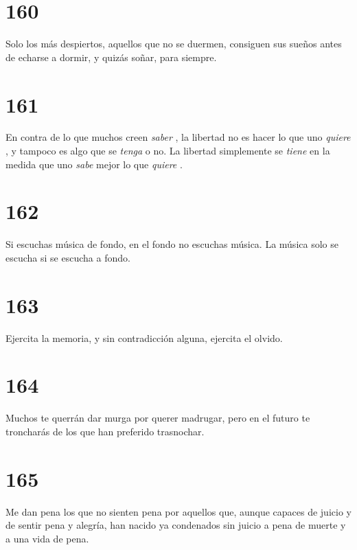 \documentclass[a4paper,11pt,openright,twocolumn]{book}
\begin{document}
\section*{160}

Solo los más despiertos, aquellos que no se duermen, consiguen sus sueños antes de echarse a dormir,
y quizás soñar, para siempre.

\section*{161}

En contra de lo que muchos creen {\it saber}  , la libertad no es hacer lo que uno {\it quiere}  , y tampoco 
es algo que se {\it tenga}   o no. La libertad simplemente 
se {\it tiene}   en la medida que uno {\it sabe}   mejor lo que {\it quiere}  . 

\section*{162}

Si escuchas música de fondo, en el fondo no escuchas música. La música solo se escucha si se escucha a fondo. 

\section*{163}

Ejercita la memoria, y sin contradicción alguna, ejercita el olvido.  

\section*{164}

Muchos te querrán dar murga por querer madrugar, pero en el futuro te troncharás de los que han preferido 
trasnochar.

\section*{165}

Me dan pena los que no sienten pena por aquellos que, aunque capaces de juicio y de sentir pena y alegría, han nacido
ya condenados sin juicio a pena de muerte y a una vida de pena. 

\end{document}
